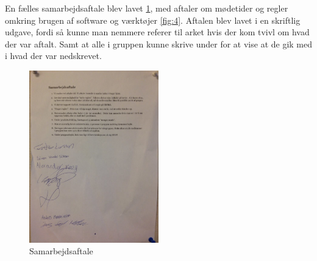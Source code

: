 En fælles samarbejdsaftale blev lavet \cref{fig:SAftale}, med aftaler om mødetider og regler omkring brugen af software og værktøjer \cref{fig:4}. Aftalen blev lavet i en skriftlig udgave, fordi så kunne man nemmere referer til arket hvis der kom tvivl om hvad der var aftalt. Samt at alle i gruppen kunne skrive under for at vise at de gik med i hvad der var nedskrevet.

\begin{figure}[ht!]
  \centering
  \includegraphics[width=0.5\textwidth]{Images/S_Aftale.jpg}
  \caption{Samarbejdsaftale}
  \label{fig:SAftale}
\end{figure}

